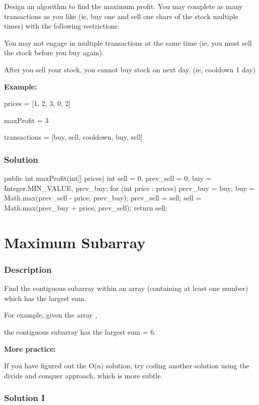 Design an algorithm to find the maximum profit. You may complete as many transactions as you like (ie, buy one and sell one share of the stock multiple times) with the following restrictions:

You may not engage in multiple transactions at the same time (ie, you must sell the stock before you buy again).

After you sell your stock, you cannot buy stock on next day. (ie, cooldown 1 day)

\textbf{Example:}

prices = [1, 2, 3, 0, 2]

maxProfit = 3

transactions = [buy, sell, cooldown, buy, sell]
\subsubsection{Solution}

\begin{Code}
public int maxProfit(int[] prices) {
    int sell = 0, prev_sell = 0, buy = Integer.MIN_VALUE, prev_buy;
    for (int price : prices) {
        prev_buy = buy;
        buy = Math.max(prev_sell - price, prev_buy);
        prev_sell = sell;
        sell = Math.max(prev_buy + price, prev_sell);
    }
    return sell;
}
\end{Code}

\newpage

\section{Maximum Subarray} %

\subsubsection{Description}
Find the contiguous subarray within an array (containing at least one number) which has the largest sum.

For example, given the array \code{[-2,1,-3,4,-1,2,1,-5,4]},

the contiguous subarray \code{[4,-1,2,1]} has the largest sum = 6.

\textbf{More practice:}

If you have figured out the O(n) solution, try coding another solution using the divide and conquer approach, which is more subtle.

\subsubsection{Solution I}

